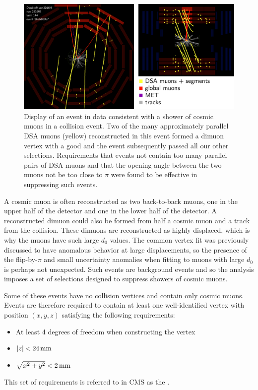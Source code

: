 \begin{figure}[htpb]
  \centering
  \includegraphics[width=\textwidth]{figures/displaced/ED_Cosmic.pdf}
  \caption[Display of an event in data consistent with a shower of cosmic muons in a \pp collision event.]{Display of an event in data consistent with a shower of cosmic muons in a \pp collision event. Two of the many approximately parallel DSA muons (yellow) reconstructed in this event formed a dimuon vertex with a good \vchisq and the event subsequently passed all our other selections. Requirements that events not contain too many parallel pairs of DSA muons and that the opening angle between the two muons not be too close to $\pi$ were found to be effective in suppressing such events.}
  \label{fig:dd:shower}
\end{figure}

A cosmic muon is often reconstructed as two back-to-back muons, one in the upper half of the detector and one in the lower half of the detector.
A reconstructed dimuon could also be formed from half a cosmic muon and a track from the \pp collision.
These dimuons are reconstructed as highly displaced, which is why the muons have such large $d_0$ values.
The common vertex fit was previously discussed to have anomalous behavior at large displacements, so the presence of the flip-by-$\pi$ and small \pT uncertainty anomalies when fitting to muons with large $d_0$ is perhaps not unexpected.
Such events are background events and so the analysis imposes a set of selections designed to suppress showers of cosmic muons.

Some of these events have no \pp collision vertices and contain only cosmic muons.
Events are therefore required to contain at least one well-identified vertex with position $(x, y, z)$ satisfying the following requirements:
\begin{itemize}
  \item At least 4 degrees of freedom when constructing the vertex
  \item $|z| < 24\,\text{mm}$
  \item $\sqrt{x^2 + y^2} < 2\,\text{mm}$
\end{itemize}
This set of requirements is referred to in CMS as the .

